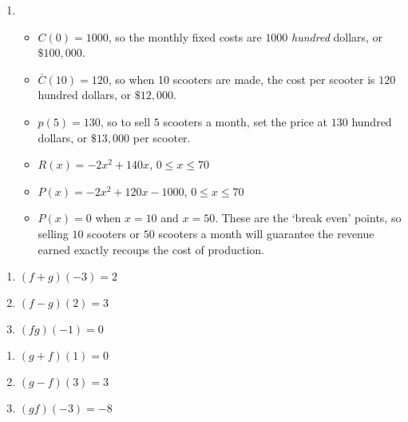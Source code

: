 \begin{enumerate}
\item  \begin{itemize}

\item  $C(0) = 1000$, so the monthly fixed costs are $1000$ \textit{hundred} dollars, or $\$100,\!000$.

\item  $\overline{C}(10) = 120$, so when 10 scooters are made, the cost per scooter is $120$ hundred dollars, or $\$12,\!000$.

\item  $p(5) = 130$, so to sell $5$ scooters a month, set the price at $130$ hundred dollars, or $\$13,\!000$ per scooter.

\item $R(x) = -2x^2+140x$, $0 \leq x \leq 70$

\item  $P(x) = -2x^2+120x-1000$, $0 \leq x \leq 70$

\item  $P(x) = 0$ when $x = 10$ and $x=50$.  These are the `break even' points, so selling $10$ scooters or $50$ scooters a month will guarantee the revenue earned exactly recoups the cost of production.

\end{itemize}

\setcounter{HW}{\value{enumi}}
\end{enumerate}

\begin{multicols}{3}
\begin{enumerate}
\setcounter{enumi}{\value{HW}}

\item $(f + g)(-3) = 2$
\item $(f - g)(2) = 3$
\item $(fg)(-1) = 0$

\setcounter{HW}{\value{enumi}}
\end{enumerate}
\end{multicols}

\begin{multicols}{3}
\begin{enumerate}
\setcounter{enumi}{\value{HW}}

\item $(g + f)(1) = 0$
\item $(g - f)(3) = 3$
\item $(gf)(-3) = -8$

\setcounter{HW}{\value{enumi}}
\end{enumerate}
\end{multicols}

